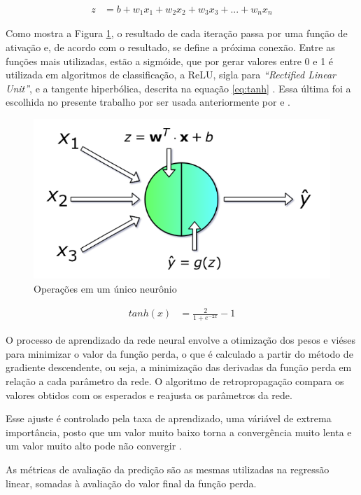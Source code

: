 \documentclass[brazil,tf,epusp]{usp}  %
\begin{document}
\begin{align}
  z &= b + {w}_1 {x}_1 + {w}_2 {x}_2 + {w}_3 {x}_3 + ... + {w}_n {x}_n \label{eq:single-neuron}
\end{align}

Como mostra a Figura \ref{fig:single-neuron}, o resultado de cada iteração passa por uma função de ativação e, de acordo com o resultado, se define a próxima conexão. Entre as funções mais utilizadas, estão a sigmóide, que por gerar valores entre 0 e 1 é utilizada em algoritmos de classificação, a ReLU, sigla para \textit{``Rectified Linear Unit''}, e a tangente hiperbólica, descrita na equação \ref{eq:tanh} \cite{Skalski2017}. Essa última foi a escolhida no presente trabalho por ser usada anteriormente por  e .

\begin{figure}[ht!]
  \includegraphics[width=.7\textwidth]{img/single-neuron.png}
  \caption{Operações em um único neurônio \cite{Skalski2017}}
  \label{fig:single-neuron}
\end{figure}

\begin{align}
  tanh (x) &= \frac{2}{1 + e^{-2x}} - 1
  \label{eq:tanh}
\end{align}

O processo de aprendizado da rede neural envolve a otimização dos pesos e viéses para minimizar o valor da função perda, o que é calculado a partir do método de gradiente descendente, ou seja, a minimização das derivadas da função perda em relação a cada parâmetro da rede. O algoritmo de retropropagação compara os valores obtidos com os esperados e reajusta os parâmetros da rede.

Esse ajuste é controlado pela taxa de aprendizado, uma váriável de extrema importância, posto que um valor muito baixo torna a convergência muito lenta e um valor muito alto pode não convergir \cite{Skalski2017}.

As métricas de avaliação da predição são as mesmas utilizadas na regressão linear, somadas à avaliação do valor final da função perda.
\end{document}
